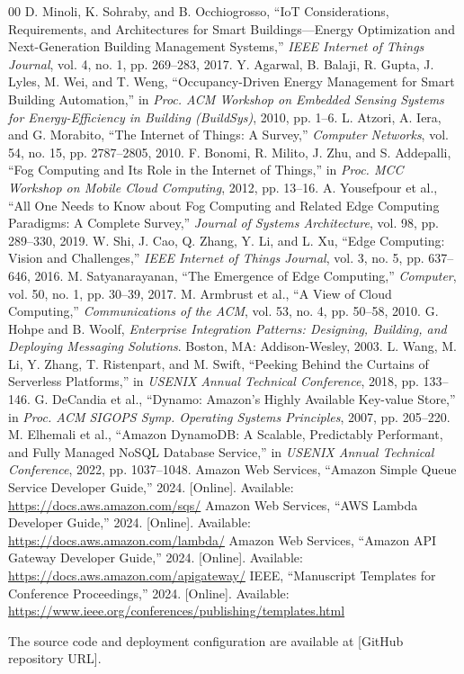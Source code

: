 \documentclass[conference]{IEEEtran}
\begin{document}
\begin{thebibliography}{00}
 D. Minoli, K. Sohraby, and B. Occhiogrosso, ``IoT Considerations, Requirements, and Architectures for Smart Buildings---Energy Optimization and Next-Generation Building Management Systems,'' \emph{IEEE Internet of Things Journal}, vol. 4, no. 1, pp. 269--283, 2017.
 Y. Agarwal, B. Balaji, R. Gupta, J. Lyles, M. Wei, and T. Weng, ``Occupancy-Driven Energy Management for Smart Building Automation,'' in \emph{Proc. ACM Workshop on Embedded Sensing Systems for Energy-Efficiency in Building (BuildSys)}, 2010, pp. 1--6.
 L. Atzori, A. Iera, and G. Morabito, ``The Internet of Things: A Survey,'' \emph{Computer Networks}, vol. 54, no. 15, pp. 2787--2805, 2010.
 F. Bonomi, R. Milito, J. Zhu, and S. Addepalli, ``Fog Computing and Its Role in the Internet of Things,'' in \emph{Proc. MCC Workshop on Mobile Cloud Computing}, 2012, pp. 13--16.
 A. Yousefpour et al., ``All One Needs to Know about Fog Computing and Related Edge Computing Paradigms: A Complete Survey,'' \emph{Journal of Systems Architecture}, vol. 98, pp. 289--330, 2019.
 W. Shi, J. Cao, Q. Zhang, Y. Li, and L. Xu, ``Edge Computing: Vision and Challenges,'' \emph{IEEE Internet of Things Journal}, vol. 3, no. 5, pp. 637--646, 2016.
 M. Satyanarayanan, ``The Emergence of Edge Computing,'' \emph{Computer}, vol. 50, no. 1, pp. 30--39, 2017.
 M. Armbrust et al., ``A View of Cloud Computing,'' \emph{Communications of the ACM}, vol. 53, no. 4, pp. 50--58, 2010.
 G. Hohpe and B. Woolf, \emph{Enterprise Integration Patterns: Designing, Building, and Deploying Messaging Solutions}. Boston, MA: Addison-Wesley, 2003.
 L. Wang, M. Li, Y. Zhang, T. Ristenpart, and M. Swift, ``Peeking Behind the Curtains of Serverless Platforms,'' in \emph{USENIX Annual Technical Conference}, 2018, pp. 133--146.
 G. DeCandia et al., ``Dynamo: Amazon's Highly Available Key-value Store,'' in \emph{Proc. ACM SIGOPS Symp. Operating Systems Principles}, 2007, pp. 205--220.
 M. Elhemali et al., ``Amazon DynamoDB: A Scalable, Predictably Performant, and Fully Managed NoSQL Database Service,'' in \emph{USENIX Annual Technical Conference}, 2022, pp. 1037--1048.
 Amazon Web Services, ``Amazon Simple Queue Service Developer Guide,'' 2024. [Online]. Available: \url{https://docs.aws.amazon.com/sqs/}
 Amazon Web Services, ``AWS Lambda Developer Guide,'' 2024. [Online]. Available: \url{https://docs.aws.amazon.com/lambda/}
 Amazon Web Services, ``Amazon API Gateway Developer Guide,'' 2024. [Online]. Available: \url{https://docs.aws.amazon.com/apigateway/}
 IEEE, ``Manuscript Templates for Conference Proceedings,'' 2024. [Online]. Available: \url{https://www.ieee.org/conferences/publishing/templates.html}
\end{thebibliography}

The source code and deployment configuration are available at [GitHub repository URL].
\end{document}
